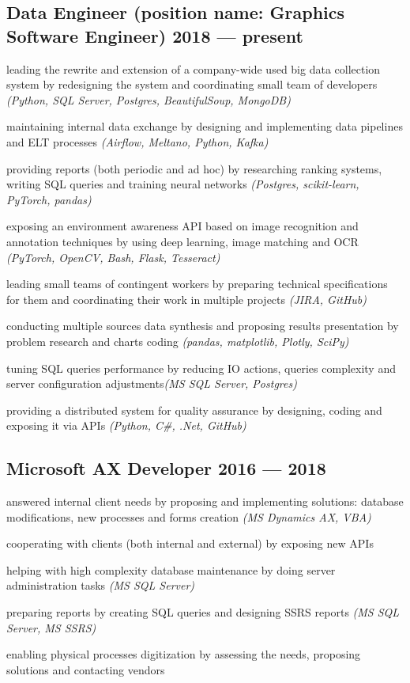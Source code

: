 \documentclass[letter,10pt]{article}
\begin{document}
\subsection{{Data Engineer (position name: Graphics Software Engineer) \hfill 2018 --- present}}
\begin{zitemize}
\item leading the rewrite and extension of a company-wide used big data collection system by redesigning the system and coordinating small team of developers \emph{(Python, SQL Server, Postgres, BeautifulSoup, MongoDB)}
\item maintaining internal data exchange by designing and implementing data pipelines and ELT processes \emph{(Airflow, Meltano, Python, Kafka)}
\item providing reports (both periodic and ad hoc) by researching ranking systems, writing SQL queries and training neural networks \emph{(Postgres, scikit-learn, PyTorch, pandas)}
\item exposing an environment awareness API based on image recognition and annotation techniques by using deep learning, image matching and OCR \emph{(PyTorch, OpenCV, Bash, Flask, Tesseract)}
\item leading small teams of contingent workers by preparing technical specifications for them and coordinating their work in multiple projects \emph{(JIRA, GitHub)}
\item conducting multiple sources data synthesis and proposing results presentation by problem research and charts coding \emph{(pandas, matplotlib, Plotly, SciPy)}
\item tuning SQL queries performance by reducing IO actions, queries complexity and server configuration adjustments\emph{(MS SQL Server, Postgres)}
\item providing a distributed system for quality assurance by designing, coding and exposing it via APIs \emph{(Python, C\#, .Net, GitHub)}
\end{zitemize}

\subsection{{Microsoft AX Developer \hfill 2016 --- 2018}}
\begin{zitemize}
\item answered internal client needs by proposing and implementing solutions: database modifications, new processes and forms creation \emph{(MS Dynamics AX, VBA)}
\item cooperating with clients (both internal and external) by exposing new APIs
\item helping with high complexity database maintenance by doing server administration tasks \emph{(MS SQL Server)}
\item preparing reports by creating SQL queries and designing SSRS reports \emph{(MS SQL Server, MS SSRS)}
\item enabling physical processes digitization by assessing the needs, proposing solutions and contacting vendors
\end{zitemize}
\end{document}
